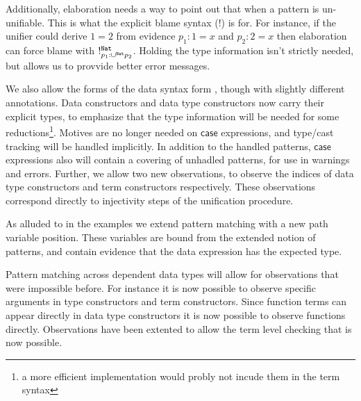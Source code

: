 Additionally, elaboration needs a way to point out that when a pattern is un-unifiable.
This is what the explicit blame syntax ($!$) is for.
For instance, if the unifier could derive $1=2$ from evidence $p_{1}:1=x$ and $p_{2}:2=x$ then elaboration can force blame with $!_{p_{1}:\cup^{\mathtt{Nat}{}}p_{2}}^{\mathtt{Nat}{}}$.
Holding the type information isn't strictly needed, but allows us to provvide better error messages.
 
We also allow the forms of the data syntax form , though with slightly different annotations.
Data constructors and data type constructors now carry their explicit types, to emphasize that the type information will be needed for some reductions\footnote{
  a more efficient implementation would probly not incude them in the term syntax}.
Motives are no longer needed on $\mathsf{case}$ expressions, and type/cast tracking will be handled implicitly.
In addition to the handled patterns, $\mathsf{case}$ expressions also will contain a covering of unhadled patterns, for use in warnings and errors.
Further, we allow two new observations, to observe the indices of data type constructors and term constructors respectively.
These observations correspond directly to injectivity steps of the unification procedure.
 
As alluded to in the examples we extend pattern matching with a new path variable position.
These variables are bound from the extended notion of patterns, and contain evidence that the data expression has the expected type.

Pattern matching across dependent data types will allow for observations that were impossible before.
For instance it is now possible to observe specific arguments in type constructors and term constructors.
Since function terms can appear directly in data type constructors it is now possible to observe functions directly.
Observations have been extented to allow the term level checking that is now possible.



